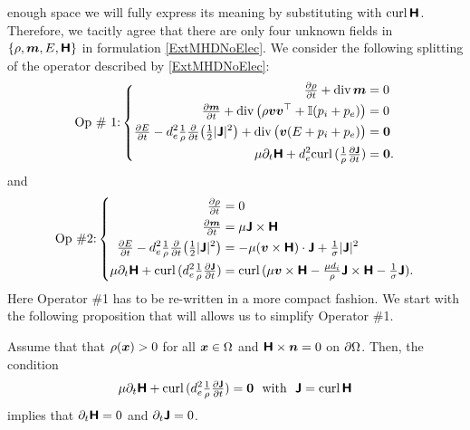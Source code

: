\documentclass[preprint,1p]{elsarticle}
\begin{document}
enough space we will fully express its meaning by substituting with
$\text{curl} \, \mathbf{}\boldsymbol{\mathsf{H}}$. Therefore, we tacitly agree that there are only four
unknown fields in $\{\rho, \boldsymbol{m}, E, \boldsymbol{\mathsf{H}}\}$ in formulation
\eqref{ExtMHDNoElec}. We consider the following splitting of the operator
described by \eqref{ExtMHDNoElec}:
\begin{align}
\label{SeylerOp1}
\text{Op \# 1:}
\left\{
\begin{aligned}
\tfrac{\partial \rho}{\partial t} + \diver{}\mom &= 0 \\
%
\tfrac{\partial \mom}{\partial t} + \diver{}
\big( \rho \vel\vel^\transp
+ \mathbb{I} (p_i + p_e) \big)
&= 0  \\
%
\tfrac{\partial \totme}{\partial t}
- d_e^2 \tfrac{1}{\rho} \tfrac{\partial}{\partial t}\big(
\tfrac{1}{2}|\current|^2\big)
+ \diver{}\big( \vel (\totme + p_i +
p_e) \big)
&= \bzero \\
%
\mu \partial_t \Hfield
+ d_e^2 \curl{}( \tfrac{1}{\rho} \tfrac{\partial \current}{\partial t})
&= \bzero .
\end{aligned}
\right.
\end{align}
and
\begin{align}
\label{SeylerOp2}
\text{Op \#2:}
\left\{
\begin{aligned}
\tfrac{\partial \rho}{\partial t} &= 0 \\
%
\tfrac{\partial \mom}{\partial t} &=
\mu \current \times \Hfield \\
%
\tfrac{\partial \totme}{\partial t}
- d_e^2 \tfrac{1}{\rho} \tfrac{\partial}{\partial t}\big(
\tfrac{1}{2}|\current|^2\big)
&= - \mu (\vel \times \Hfield) \cdot\current
+ \tfrac{1}{\conduct} |\current|^2  \\
%
\mu \partial_t \Hfield
+ \curl{}(d_e^2 \tfrac{1}{\rho} \tfrac{\partial \current}{\partial t})
&= \curl{}(\mu \vel \times \Hfield
- \tfrac{\mu d_i}{\rho} \current \times \Hfield
- \tfrac{1}{\conduct} \current) .
\end{aligned}
\right.
\end{align}
Here Operator \#1 has to be re-written in a more compact fashion. We start with
the following proposition that will allows us to simplify Operator \#1.

\begin{proposition}\label{PropNoDtH} Assume that that $\rho(\boldsymbol{x}) >
0$ for all $\boldsymbol{x} \in \Omega$ and  $\boldsymbol{\mathsf{H}} \times \boldsymbol{n} = 0$ on
$\partial\Omega$. Then, the condition
\begin{align}
\label{SplitConditionH}
\mu \partial_t \boldsymbol{\mathsf{H}}
+ \text{curl} \, \mathbf{}(d_e^2 \tfrac{1}{\rho} \tfrac{\partial \boldsymbol{\mathsf{J}}}{\partial t})
= \boldsymbol{0} \ \ \text{with} \ \ \boldsymbol{\mathsf{J}} = \text{curl} \, \mathbf{}\boldsymbol{\mathsf{H}}
\end{align}
implies that $\partial_t \boldsymbol{\mathsf{H}} = 0$ and $\partial_t \boldsymbol{\mathsf{J}} = 0$.
\end{proposition}
\end{document}
